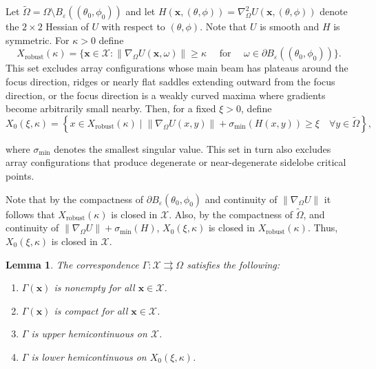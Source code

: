 \documentclass[11pt,letterpaper]{article}
\theoremstyle{definition}
\theoremstyle{plain}
\newtheorem{lemma}[theorem]{Lemma}
\begin{document}
Let $\tilde{\Omega} = \Omega \setminus B_\varepsilon((\theta_0, \phi_0))$ and let $H(\mathbf{x}, (\theta, \phi)) = \nabla_\Omega^2 U(\mathbf{x}, (\theta, \phi))$ denote the $2 \times 2$ Hessian of $U$ with respect to $(\theta, \phi)$. Note that $U$ is smooth and $H$ is symmetric. For $\kappa>0$ define
\begin{equation}
    X_{\mathrm{robust}}(\kappa) = \{\mathbf{x}\in\mathcal{X} : \|\nabla_\Omega U(\mathbf{x},\omega)\|\geq \kappa
\quad\text{ for }\quad
\omega\in \partial B_\varepsilon((\theta_0,\phi_0)) \}.
\end{equation}
This set excludes array configurations whose main beam has plateaus around the focus direction,
ridges or nearly flat saddles extending outward from the focus direction, or the focus direction is a weakly curved maxima where gradients become arbitrarily small nearby.
Then, for a fixed $\xi > 0$, define
\begin{equation} \label{X0def}
X_0(\xi, \kappa) = \left\{ x \in X_{\mathrm{robust}}(\kappa) \;\Big|\; \|\nabla_{\Omega} U(x, y)\| + \sigma_{\min}(H(x, y)) \ge \xi \quad \forall y \in \tilde{\Omega} \right\},
\end{equation}

where $\sigma_{\min}$ denotes the smallest singular value. This set in turn also excludes array configurations that produce degenerate or near-degenerate sidelobe critical points.

Note that by the compactness of $\partial B_\varepsilon(\theta_0,\phi_0)$ and continuity of $\|\nabla_\Omega U\|$ it follows that $X_{\mathrm{robust}}(\kappa)$ is closed in $\mathcal{X}$. Also, by the compactness of $\tilde{\Omega}$, and continuity of $\|\nabla_{\Omega} U\| + \sigma_{\min}(H)$, $X_0(\xi, \kappa)$ is closed in $X_{\mathrm{robust}}(\kappa)$. Thus, $X_0(\xi, \kappa)$ is closed in $\mathcal{X}$.


\begin{lemma}
\label{prop:Gamma}
The correspondence $\Gamma : \mathcal{X} \rightrightarrows \Omega$ satisfies the following:
\begin{enumerate}[label=\emph{(\roman*)}]
    \item $\Gamma(\mathbf{x})$ is nonempty for all $\mathbf{x} \in \mathcal{X}$.
    \item $\Gamma(\mathbf{x})$ is compact for all $\mathbf{x} \in \mathcal{X}$.
    \item $\Gamma$ is upper hemicontinuous on $\mathcal{X}$.
    \item $\Gamma$ is lower hemicontinuous on $X_0(\xi, \kappa)$.
\end{enumerate}
\end{lemma}
\end{document}
